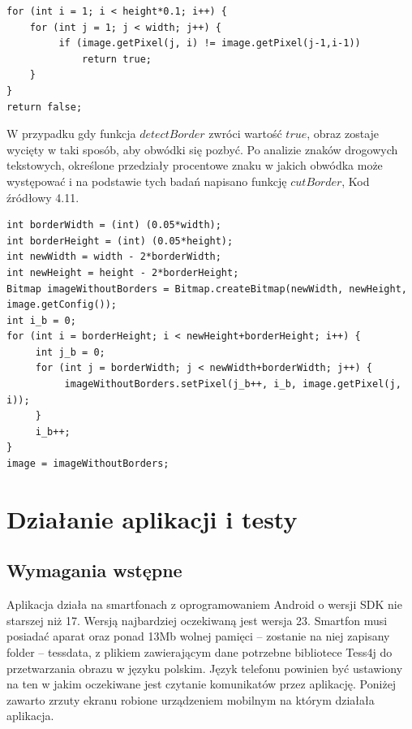 \documentclass[eng,oneside]{mgr}
\begin{document}
\begin{lstlisting}[caption={Kod programu, odpowiadający za sprawdzenie czy wykryty prostokąt otoczony jest obwódką w innym kolorze}]
for (int i = 1; i < height*0.1; i++) {
    for (int j = 1; j < width; j++) {
         if (image.getPixel(j, i) != image.getPixel(j-1,i-1))
             return true;
    }
}
return false;
\end{lstlisting}
\par W przypadku gdy funkcja $detectBorder$ zwróci wartość $true$, obraz zostaje wycięty w taki sposób, aby obwódki się pozbyć. Po analizie znaków drogowych tekstowych, określone przedziały procentowe znaku w jakich obwódka może występować i na podstawie tych badań napisano funkcję $cutBorder$, Kod źródłowy 4.11.
\begin{lstlisting}[caption={Kod programu, odpowiadający za obcięcie obrazu o konkretną procentową wartość}]
int borderWidth = (int) (0.05*width);
int borderHeight = (int) (0.05*height);
int newWidth = width - 2*borderWidth;
int newHeight = height - 2*borderHeight;
Bitmap imageWithoutBorders = Bitmap.createBitmap(newWidth, newHeight, image.getConfig());
int i_b = 0;
for (int i = borderHeight; i < newHeight+borderHeight; i++) {
     int j_b = 0;
     for (int j = borderWidth; j < newWidth+borderWidth; j++) {
          imageWithoutBorders.setPixel(j_b++, i_b, image.getPixel(j, i));
     }
     i_b++;
}
image = imageWithoutBorders;
\end{lstlisting}
\chapter{Działanie aplikacji i testy}
\section{Wymagania wstępne}
Aplikacja działa na smartfonach z oprogramowaniem Android o wersji SDK nie starszej niż 17. Wersją najbardziej oczekiwaną jest wersja 23. Smartfon musi posiadać aparat oraz ponad 13Mb wolnej pamięci – zostanie na niej zapisany folder – tessdata, z plikiem zawierającym dane potrzebne bibliotece Tess4j do przetwarzania obrazu w języku polskim. Język telefonu powinien być ustawiony na ten w jakim oczekiwane jest czytanie komunikatów przez aplikację. Poniżej zawarto zrzuty ekranu robione urządzeniem mobilnym na którym działała aplikacja.
\end{document}
